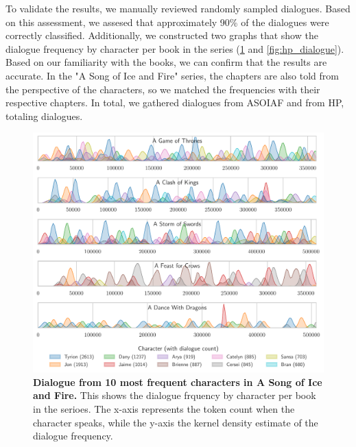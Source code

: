\documentclass[fleqn,moreauthors,10pt]{ds_report}
\begin{document}
To validate the results, we manually reviewed randomly sampled dialogues. Based on this assessment, we assesed that approximately 90\% of the dialogues were correctly classified. Additionally, we constructed two graphs that show the dialogue frequency by character per book in the series (\cref{fig:asoif_dialogue} and \cref{fig:hp_dialogue}). Based on our familiarity with the books, we can confirm that the results are accurate. In the "A Song of Ice and Fire" series, the chapters are also told from the perspective of the characters, so we matched the frequencies with their respective chapters. In total, we gathered  dialogues from ASOIAF and  from HP, totaling  dialogues.

\begin{figure}[H]

	\centering
	\includegraphics[width=\linewidth]{asoif_dialogue.pdf}
	\caption{\textbf{Dialogue from 10 most frequent characters in A Song of Ice and Fire.} This shows the dialogue frquency by character per book in the serioes. The x-axis represents the token count when the character speaks, while the y-axis the kernel density estimate of the dialogue frequency.}
	\label{fig:asoif_dialogue}
\end{figure}
\end{document}
